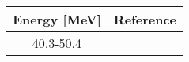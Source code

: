 \begin{tabular}{|c||c|} 
    \hline 
    \bf{Energy [MeV]} & \bf{Reference} \\
    \hline
    \hline 
    40.3-50.4 & \cite{Zanelli81}\\
    \hline
\end{tabular}
